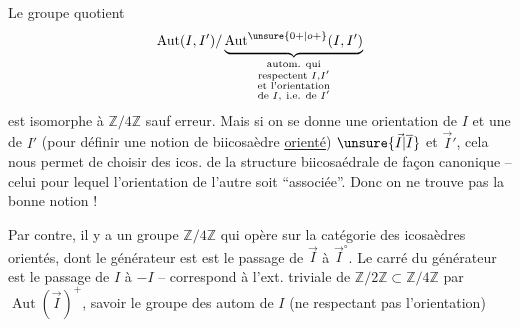 Le groupe quotient
\[
\operatorname{Aut}(I,I')/
\underbrace{\operatorname{Aut}^{\unsure{0+|o+}}(I,I')}_{
\substack{\text{autom. qui}\\\text{respectent }I,I'\\\text{et l'orientation}\\
\text{de }I,\ \text{i.e. de }I'}}
\]
est isomorphe à \uline{$\mathbb Z/4\mathbb Z$} sauf erreur.
Mais si on  se donne une
 
orientation de $I$ et une de $I'$ (pour
définir une notion de biicosaèdre \uline{orienté})
 $\unsure{\vec I|\overline I}$ et $\vec I'$, cela nous permet
de choisir  des icos. de la structure
biicosaédrale de façon canonique -- 
celui pour lequel l'orientation de l'autre
soit ``associée''. Donc on ne trouve pas
la bonne notion !

Par contre, il y a un groupe $\mathbb Z/4\mathbb Z$
qui opère sur la catégorie des
icosaèdres orientés, dont le générateur est
 est le passage de $\vec I$ à $\vec I^\circ$.
Le carré du générateur est le passage
de $I$ à $-I$ -- correspond à l'ext.
triviale de $\mathbb Z/2\mathbb Z\subset\mathbb Z/4\mathbb Z$ par
$\operatorname{Aut}(\vec I)^+$, savoir le groupe des autom
de  $I$ (ne respectant pas l'orientation)

